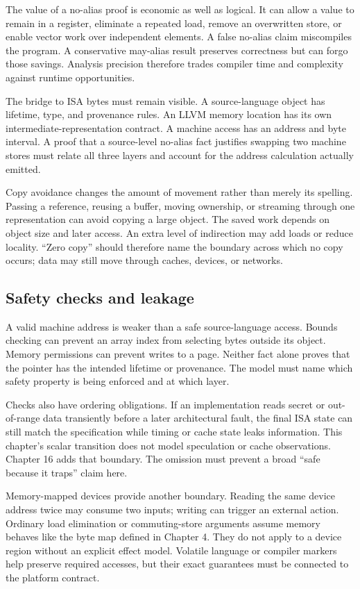 The value of a no-alias proof is economic as well as logical. It can allow a
value to remain in a register, eliminate a repeated load, remove an overwritten
store, or enable vector work over independent elements. A false no-alias claim
miscompiles the program. A conservative may-alias result preserves correctness
but can forgo those savings. Analysis precision therefore trades compiler
time and complexity against runtime opportunities.

The bridge to ISA bytes must remain visible. A source-language object has
lifetime, type, and provenance rules. An LLVM memory location has its own
intermediate-representation contract. A machine access has an address and byte
interval. A proof that a source-level no-alias fact justifies swapping two
machine stores must relate all three layers and account for the address
calculation actually emitted.

Copy avoidance changes the amount of movement rather than merely its spelling.
Passing a reference, reusing a buffer, moving ownership, or streaming through
one representation can avoid copying a large object. The saved work depends on
object size and later access. An extra level of indirection may add loads or
reduce locality. ``Zero copy'' should therefore name the boundary across which
no copy occurs; data may still move through caches, devices, or networks.

\subsection{Safety checks and leakage}

A valid machine address is weaker than a safe source-language access. Bounds
checking can prevent an array index from selecting bytes outside its object.
Memory permissions can prevent writes to a page. Neither fact alone proves
that the pointer has the intended lifetime or provenance. The model must name
which safety property is being enforced and at which layer.

Checks also have ordering obligations. If an implementation reads secret or
out-of-range data transiently before a later architectural fault, the final
ISA state can still match the specification while timing or cache state leaks
information. This chapter's scalar transition does not model speculation or
cache observations. Chapter 16 adds that boundary. The omission must prevent
a broad ``safe because it traps'' claim here.

Memory-mapped devices provide another boundary. Reading the same device
address twice may consume two inputs; writing can trigger an external action.
Ordinary load elimination or commuting-store arguments assume memory behaves
like the byte map defined in Chapter 4. They do not apply to a device region
without an explicit effect model. Volatile language or compiler markers help
preserve required accesses, but their exact guarantees must be connected to
the platform contract.

